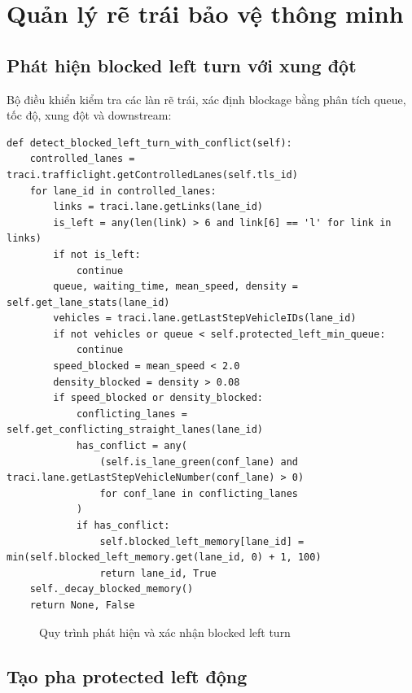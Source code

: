\section{Quản lý rẽ trái bảo vệ thông minh}

\subsection{Phát hiện blocked left turn với xung đột}

Bộ điều khiển kiểm tra các làn rẽ trái, xác định blockage bằng phân tích queue, tốc độ, xung đột và downstream:

\begin{lstlisting}[style=py,caption={Hàm detect\_blocked\_left\_turn\_with\_conflict}]
def detect_blocked_left_turn_with_conflict(self):
    controlled_lanes = traci.trafficlight.getControlledLanes(self.tls_id)
    for lane_id in controlled_lanes:
        links = traci.lane.getLinks(lane_id)
        is_left = any(len(link) > 6 and link[6] == 'l' for link in links)
        if not is_left:
            continue
        queue, waiting_time, mean_speed, density = self.get_lane_stats(lane_id)
        vehicles = traci.lane.getLastStepVehicleIDs(lane_id)
        if not vehicles or queue < self.protected_left_min_queue:
            continue
        speed_blocked = mean_speed < 2.0
        density_blocked = density > 0.08
        if speed_blocked or density_blocked:
            conflicting_lanes = self.get_conflicting_straight_lanes(lane_id)
            has_conflict = any(
                (self.is_lane_green(conf_lane) and traci.lane.getLastStepVehicleNumber(conf_lane) > 0)
                for conf_lane in conflicting_lanes
            )
            if has_conflict:
                self.blocked_left_memory[lane_id] = min(self.blocked_left_memory.get(lane_id, 0) + 1, 100)
                return lane_id, True
    self._decay_blocked_memory()
    return None, False
\end{lstlisting}

\begin{figure}[H]
    \centering
    \caption{Quy trình phát hiện và xác nhận blocked left turn}
    \label{fig:blocked_left_detection_diagram}
\end{figure}

\subsection{Tạo pha protected left động}

